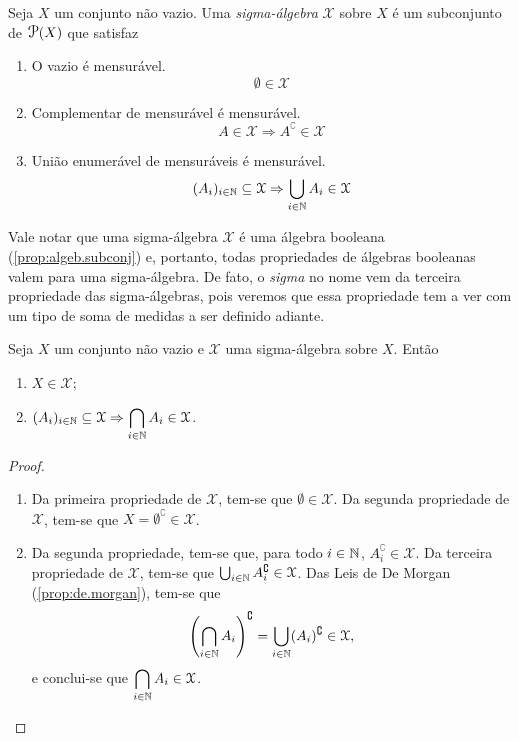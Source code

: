 \begin{defi}
	Seja $X$ um conjunto não vazio. Uma \emph{sigma-álgebra} $\mathcal X$ sobre $X$ é um subconjunto de $\p(X)$ que satisfaz
	\begin{enumerate}
	\item O vazio é mensurável.
	\begin{equation*}
	\emptyset \in \mathcal X
	\end{equation*}

	\item Complementar de mensurável é mensurável.
	\begin{equation*}
	A \in \mathcal X \Rightarrow A^\complement \in \mathcal X
	\end{equation*}
	\item União enumerável de mensuráveis é mensurável.
	\begin{equation*}
	(A_i)_{i \in \mathbb{N}} \subseteq \mathcal X \Rightarrow \bigcup_{i \in \mathbb{N}} A_i \in \mathcal X
	\end{equation*}
	\end{enumerate}
\end{defi}

	Vale notar que uma sigma-álgebra $\mathcal X$ é uma álgebra booleana (\ref{prop:algeb.subconj}) e, portanto, todas propriedades de álgebras booleanas valem para uma sigma-álgebra. De fato, o \textit{sigma} no nome vem da terceira propriedade das sigma-álgebras, pois veremos que essa propriedade tem a ver com um tipo de soma de medidas a ser definido adiante.

\begin{prop}
	Seja $X$ um conjunto não vazio e $\mathcal X$ uma sigma-álgebra sobre $X$. Então
	\begin{enumerate}
	\item $X \in \mathcal X$;
	\item $(A_i)_{i \in \mathbb{N}} \subseteq \mathcal X \Rightarrow \displaystyle \bigcap_{i \in \mathbb{N}} A_i \in \mathcal X$.
	\end{enumerate}
\end{prop}
\begin{proof}
	\begin{enumerate}
	\item Da primeira propriedade de $\mathcal X$, tem-se que $\emptyset \in \mathcal X$. Da segunda propriedade de $\mathcal X$, tem-se que $X = \emptyset^\complement \in \mathcal X$.
	\item Da segunda propriedade, tem-se que, para todo $i \in \mathbb{N}$, $A_i^\complement \in \mathcal X$. Da terceira propriedade de $\mathcal X$, tem-se que $\bigcup_{i \in \mathbb{N}} A_i^\complement \in \mathcal X$. Das Leis de De Morgan (\ref{prop:de.morgan}), tem-se que
	\begin{equation*}
	\left(\bigcap_{i \in \mathbb{N}} A_i \right)^\complement = \bigcup_{i \in \mathbb{N}} (A_i)^\complement \in \mathcal X,
	\end{equation*}
e conclui-se que $\displaystyle\bigcap_{i \in \mathbb{N}} A_i \in \mathcal X$.
	\end{enumerate}
\end{proof}

